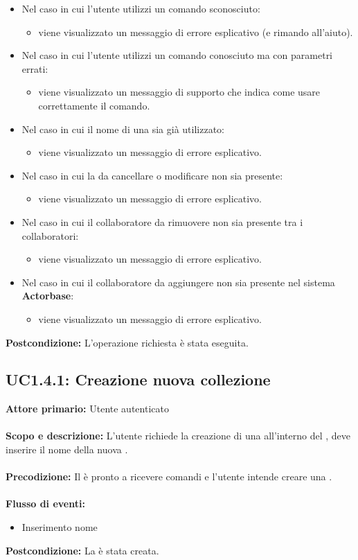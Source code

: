 \documentclass{scalatekids-article}
\begin{document}
\begin{itemize}
\item Nel caso in cui l'utente utilizzi un comando sconosciuto:
  \begin{itemize}
  \item viene visualizzato un messaggio di errore esplicativo (e rimando all'aiuto).
  \end{itemize}
\item Nel caso in cui l'utente utilizzi un comando conosciuto ma con parametri errati:
  \begin{itemize}
  \item viene visualizzato un messaggio di supporto che indica come usare correttamente il comando.
  \end{itemize}
\item Nel caso in cui il nome di una  sia già utilizzato:
  \begin{itemize}
  \item viene visualizzato un messaggio di errore esplicativo.
  \end{itemize}
\item Nel caso in cui la  da cancellare o modificare non sia presente:
  \begin{itemize}
  \item viene visualizzato un messaggio di errore esplicativo.
  \end{itemize}
\item Nel caso in cui il collaboratore da rimuovere non sia presente tra i collaboratori:
  \begin{itemize}
  \item viene visualizzato un messaggio di errore esplicativo.
  \end{itemize}
\item Nel caso in cui il collaboratore da aggiungere non sia presente nel sistema \textbf{Actorbase}:
  \begin{itemize}
  \item viene visualizzato un messaggio di errore esplicativo.
  \end{itemize}
\end{itemize}
\textbf{Postcondizione:} L'operazione richiesta è stata eseguita.
\subsection{UC1.4.1: Creazione nuova collezione}
\textbf{Attore primario:} Utente autenticato\\ \\
\textbf{Scopo e descrizione:} L'utente richiede la creazione di una  all'interno del , deve inserire il nome della nuova .\\ \\
\textbf{Precodizione:} Il  è pronto a ricevere comandi e l'utente intende creare una .\\ \\
\textbf{Flusso di eventi:}
\begin{itemize}
\item Inserimento nome 
\end{itemize}
\textbf{Postcondizione:} La  è stata creata.
\end{document}
